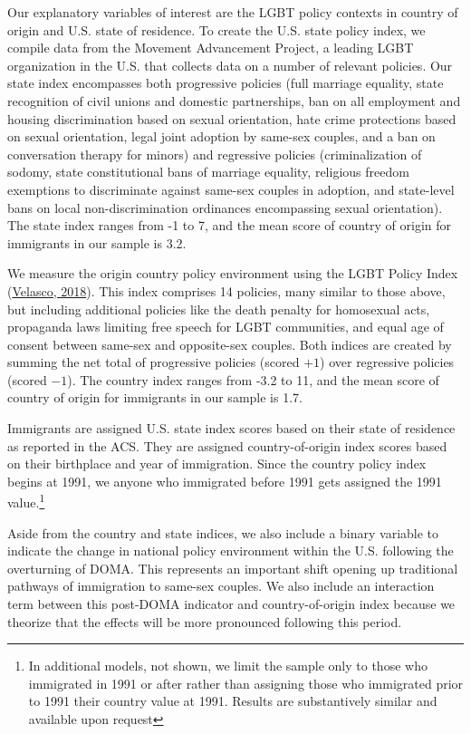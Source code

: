 \documentclass[
  11pt,
]{article}
\begin{document}
Our explanatory variables of interest are the LGBT policy contexts in country of origin and U.S. state of residence. To create the U.S. state policy index, we compile data from the Movement Advancement Project, a leading LGBT organization in the U.S. that collects data on a number of relevant policies. Our state index encompasses both progressive policies (full marriage equality, state recognition of civil unions and domestic partnerships, ban on all employment and housing discrimination based on sexual orientation, hate crime protections based on sexual orientation, legal joint adoption by same-sex couples, and a ban on conversation therapy for minors) and regressive policies (criminalization of sodomy, state constitutional bans of marriage equality, religious freedom exemptions to discriminate against same-sex couples in adoption, and state-level bans on local non-discrimination ordinances encompassing sexual orientation). The state index ranges from -1 to 7, and the mean score of country of origin for immigrants in our sample is 3.2.

We measure the origin country policy environment using the LGBT Policy Index (\protect\hyperlink{ref-velasco_2018}{Velasco, 2018}). This index comprises 14 policies, many similar to those above, but including additional policies like the death penalty for homosexual acts, propaganda laws limiting free speech for LGBT communities, and equal age of consent between same-sex and opposite-sex couples. Both indices are created by summing the net total of progressive policies (scored \(+1\)) over regressive policies (scored \(-1\)). The country index ranges from -3.2 to 11, and the mean score of country of origin for immigrants in our sample is 1.7.

Immigrants are assigned U.S. state index scores based on their state of residence as reported in the ACS. They are assigned country-of-origin index scores based on their birthplace and year of immigration. Since the country policy index begins at 1991, we anyone who immigrated before 1991 gets assigned the 1991 value.\footnote{In additional models, not shown, we limit the sample only to those who immigrated in 1991 or after rather than assigning those who immigrated prior to 1991 their country value at 1991. Results are substantively similar and available upon request}

Aside from the country and state indices, we also include a binary variable to indicate the change in national policy environment within the U.S. following the overturning of DOMA. This represents an important shift opening up traditional pathways of immigration to same-sex couples. We also include an interaction term between this post-DOMA indicator and country-of-origin index because we theorize that the effects will be more pronounced following this period.
\end{document}
